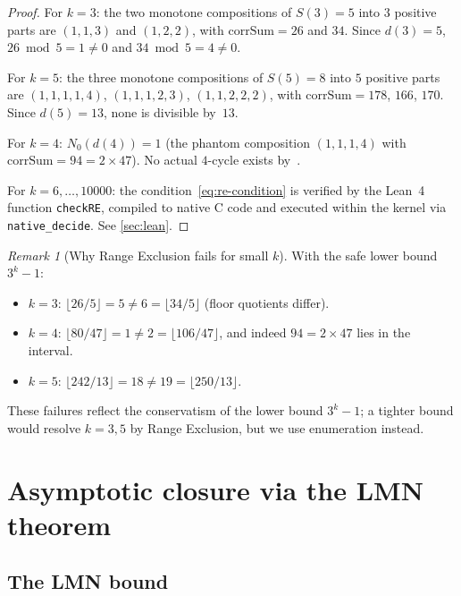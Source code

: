 \documentclass[11pt, a4paper]{amsart}
\theoremstyle{plain}
\theoremstyle{definition}
\theoremstyle{remark}
\newtheorem{remark}[theorem]{Remark}
\newcommand{\corrSum}{\mathrm{corrSum}}
\begin{document}
\begin{proof}
  For $k = 3$: the two monotone compositions of $S(3) = 5$
  into $3$ positive parts are $(1,1,3)$ and $(1,2,2)$,
  with $\corrSum = 26$ and $34$.  Since $d(3) = 5$,
  $26 \bmod 5 = 1 \neq 0$ and $34 \bmod 5 = 4 \neq 0$.

  For $k = 5$: the three monotone compositions of $S(5) = 8$
  into $5$ positive parts are $(1,1,1,1,4)$, $(1,1,1,2,3)$,
  $(1,1,2,2,2)$, with $\corrSum = 178$, $166$, $170$.
  Since $d(5) = 13$, none is divisible by~$13$.

  For $k = 4$: $N_0(d(4)) = 1$ (the phantom composition
  $(1,1,1,4)$ with $\corrSum = 94 = 2 \times 47$).
  No actual $4$-cycle exists by~\cite{SimonsDeWeger2005}.

  For $k = 6, \ldots, 10000$: the condition~\eqref{eq:re-condition}
  is verified by the Lean~4 function \texttt{checkRE},
  compiled to native C code and executed within the kernel
  via \texttt{native\_decide}.  See \cref{sec:lean}.
\end{proof}

\begin{remark}[Why Range Exclusion fails for small $k$]
  \label{rem:re-fails}
  With the safe lower bound $3^k - 1$:
  \begin{itemize}
    \item $k = 3$: $\lfloor 26/5 \rfloor = 5 \neq
      6 = \lfloor 34/5 \rfloor$ (floor quotients differ).
    \item $k = 4$: $\lfloor 80/47 \rfloor = 1 \neq
      2 = \lfloor 106/47 \rfloor$, and indeed
      $94 = 2 \times 47$ lies in the interval.
    \item $k = 5$: $\lfloor 242/13 \rfloor = 18 \neq
      19 = \lfloor 250/13 \rfloor$.
  \end{itemize}
  These failures reflect the conservatism of the lower
  bound $3^k - 1$; a tighter bound would resolve $k = 3, 5$
  by Range Exclusion, but we use enumeration instead.
\end{remark}

\section{Asymptotic closure via the LMN theorem}\label{sec:baker}

\subsection{The LMN bound}\label{ssec:lmn}
\end{document}
